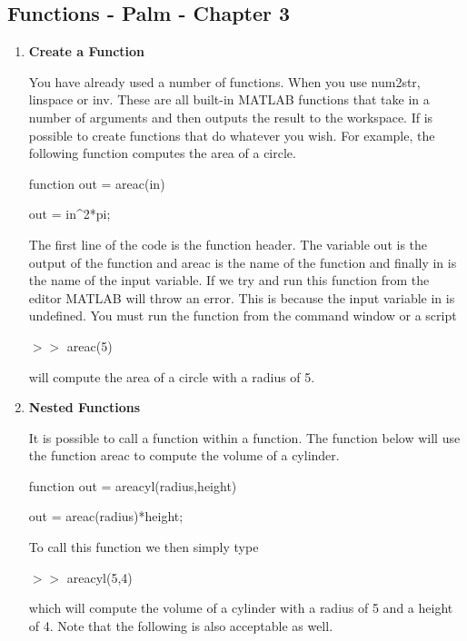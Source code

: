 \subsection{Functions - Palm - Chapter 3}

\begin{enumerate}

\item {\bf Create a Function}

You have already used a number of functions. When you use num2str,
linspace or inv. These are all built-in MATLAB functions that take in
a number of arguments and then outputs the result to the workspace. If
is possible to create functions that do whatever you wish. For
example, the following function computes the area of a circle.

\begin{framed}

function out = areac(in)

out = in\textrm{\^}2*pi;

\end{framed}

The first line of the code is the function header. The variable out is
the output of the function and areac is the name of the function and
finally in is the name of the input variable. If we try and run this
function from the editor MATLAB will throw an error. This is because
the input variable in is undefined. You must run the function from the
command window or a script

$>>$ areac(5)

will compute the area of a circle with a radius of 5.

\item {\bf Nested Functions}

It is possible to call a function within a function. The function
below will use the function areac to compute the volume of a cylinder.

\begin{framed}

function out = areacyl(radius,height)

out = areac(radius)*height;

\end{framed}

To call this function we then simply type

$>>$ areacyl(5,4)

which will compute the volume of a cylinder with a radius of 5 and a
height of 4. Note that the following is also acceptable as well.


\end{enumerate}
